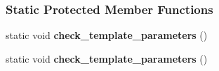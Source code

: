 \subsubsection*{Static Protected Member Functions}
\begin{DoxyCompactItemize}
\item 
\mbox{\label{group___eigenvalues___module_a92a45b56df13f177983697d50aed2df2}} 
static void {\bfseries check\+\_\+template\+\_\+parameters} ()
\item 
\mbox{\label{group___eigenvalues___module_a92a45b56df13f177983697d50aed2df2}} 
static void {\bfseries check\+\_\+template\+\_\+parameters} ()
\end{DoxyCompactItemize}
